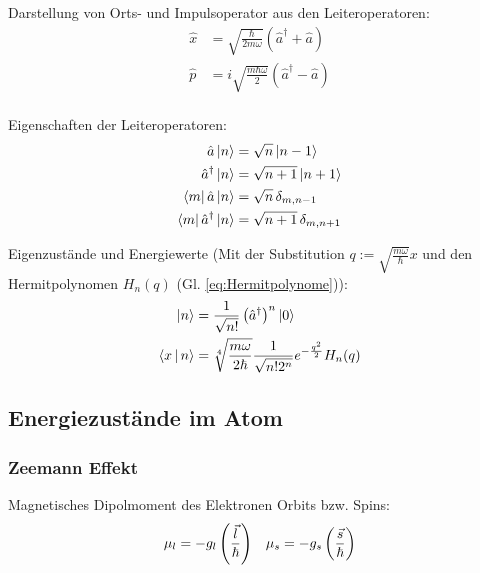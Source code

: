 			\noindent
			Darstellung von Orts- und Impulsoperator aus den Leiteroperatoren:
			\begin{equation}
				\begin{aligned}
					\hat{x} &= \sqrt{\frac{\hbar}{2m\omega}}\left(\hat{a}^\dagger + \hat{a} \right) \\
					\hat{p} &= i\sqrt{\frac{m\hbar\omega}{2}}\left(\hat{a}^\dagger - \hat{a} \right) \\
				\end{aligned}
			\end{equation}

			\noindent
			Eigenschaften der Leiteroperatoren:
			\begin{equation}
				\begin{aligned}
					\hat{a}\Ket{n} &= \sqrt{n}\Ket{n-1} \\
					\hat{a}^\dagger\Ket{n} &= \sqrt{n+1}\Ket{n+1} \\
					\Bra{m}\hat{a}\Ket{n} &= \sqrt{n} \,\delta_{m,n-1} \\
					\Bra{m}\hat{a}^\dagger\Ket{n} &= \sqrt{n+1} \,\delta_{m,n+1} \\
				\end{aligned}
			\end{equation}

			\noindent
			Eigenzustände und Energiewerte (Mit der Substitution $q:=\sqrt{\frac{m\omega}{\hbar}}x$ und den Hermitpolynomen $H_n(q)$ (Gl. \ref{eq:Hermitpolynome})):
			\begin{equation}
				\begin{aligned}
					\Ket{n} &= \frac{1}{\sqrt{n!}}\left(\hat{a}^\dagger\right)^n\Ket{0} \\
					\Braket{x|n} &= \sqrt[4]{\frac{m\omega}{2\hbar}} \frac{1}{\sqrt{n! 2^n}} e^{-\frac{q^2}{2}} H_n(q) \\
				\end{aligned}
			\end{equation}

	\subsection{Energiezustände im Atom}
		\subsubsection{Zeemann Effekt}
			\noindent
			Magnetisches Dipolmoment des Elektronen Orbits bzw. Spins:
			\begin{equation}
				\begin{aligned}
					\mu_l = -g_l\left( \frac{\vec{l}}{\hbar} \right) &&
					\mu_s = -g_s\left( \frac{\vec{s}}{\hbar} \right) \\
				\end{aligned}
			\end{equation}

